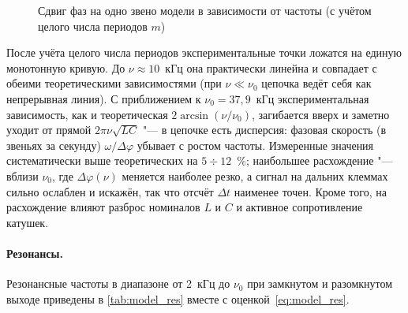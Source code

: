 \documentclass[a4paper,12pt]{article}
\begin{document}
\begin{figure}[!ht]
    \centering
    \caption{Сдвиг фаз на одно звено модели в зависимости от частоты
             (с учётом целого числа периодов $m$)}
    \label{fig:model_phase}
\end{figure}

После учёта целого числа периодов экспериментальные точки ложатся на
единую монотонную кривую. До $\nu\approx10$~кГц она практически линейна и
совпадает с обеими теоретическими зависимостями (при $\nu\ll\nu_0$
цепочка ведёт себя как непрерывная линия). С приближением к
$\nu_0 = 37{,}9$~кГц экспериментальная зависимость, как и
теоретическая $2\arcsin(\nu/\nu_0)$, загибается вверх и заметно уходит
от прямой $2\pi\nu\sqrt{LC}$ "--- в цепочке есть дисперсия: фазовая
скорость (в звеньях за секунду) $\omega/\Delta\varphi$ убывает с ростом
частоты. Измеренные значения систематически выше теоретических на
$5\div12$~\%; наибольшее расхождение "--- вблизи $\nu_0$, где
$\Delta\varphi(\nu)$ меняется наиболее резко, а сигнал на дальних
клеммах сильно ослаблен и искажён, так что отсчёт $\Delta t$ наименее
точен. Кроме того, на расхождение влияют разброс номиналов $L$ и $C$ и
активное сопротивление катушек.

\paragraph{Резонансы.} Резонансные частоты в диапазоне от 2~кГц до
$\nu_0$ при замкнутом и разомкнутом выходе приведены в
\cref{tab:model_res} вместе с оценкой~\eqref{eq:model_res}.
\end{document}
